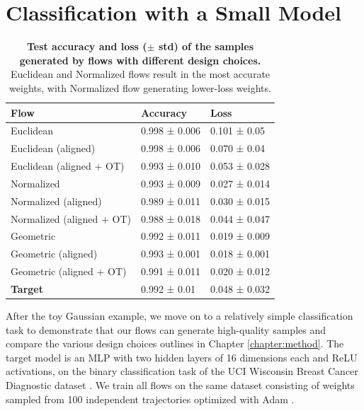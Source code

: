 \section{Classification with a Small Model} \label{sec:uci_classification}

\begin{table}[t!]
    \centering
    \begin{tabular}{lll}
        \toprule
        \textbf{Flow}  & \textbf{Accuracy} & \textbf{Loss} \\
        \midrule
        Euclidean                   & 0.998 ± 0.006     & 0.101 ± 0.05 \\ 
        Euclidean (aligned)         & 0.998 ± 0.006     & 0.070 ± 0.04 \\
        Euclidean (aligned + OT)    & 0.993 ± 0.010     & 0.053 ± 0.028 \\
        \midrule
        Normalized                  & 0.993 ± 0.009     & 0.027 ± 0.014 \\
        Normalized (aligned)        & 0.989 ± 0.011     & 0.030 ± 0.015 \\
        Normalized (aligned + OT)   & 0.988 ± 0.018	    & 0.044 ± 0.047 \\
        \midrule
        Geometric                   & 0.992 ± 0.011     & 0.019 ± 0.009 \\
        Geometric (aligned)         & 0.993 ± 0.001     & 0.018 ± 0.001 \\
        Geometric (aligned + OT)    & 0.991 ± 0.011 	& 0.020 ± 0.012 \\
        \midrule
        \textbf{Target}             & 0.992 ± 0.01      & 0.048 ± 0.032 \\
        \bottomrule
    \end{tabular}
    \caption{\label{tab:uci_class_table}\textbf{Test accuracy and loss ($\pm$ std) of the samples generated by flows with different design choices.} Euclidean and Normalized flows result in the most accurate weights, with Normalized flow generating lower-loss weights.}
\end{table}

After the toy Gaussian example, we move on to a relatively simple classification task to demonstrate that our flows can generate high-quality samples and compare the various design choices outlines in Chapter \ref{chapter:method}. The target model is an MLP with two hidden layers of 16 dimensions each and ReLU activations, on the binary classification task of the UCI Wisconsin Breast Cancer Diagnostic dataset \citep{streetNuclearFeatureExtraction1993}. We train all flows on the same dataset consisting of weights sampled from 100 independent trajectories optimized with Adam \citep{kingmaAdamMethodStochastic2017}. 

